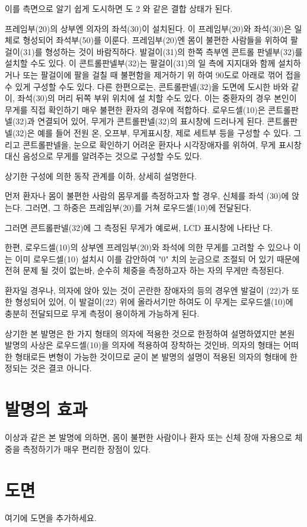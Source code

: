 \documentclass{oblivoir}
\begin{document}
	이를 측면으로 알기 쉽게 도시하면 도 2 와 같은 결합 상태가 된다. 
	
	프레임부(20)의 상부엔 의자의 좌석(30)이 설치된다. 
	이 프레임부(20)와 좌석(30)은 일체로 형성되어 좌석부(50)를 이룬다. 
	프레임부(20)엔 몸이 불편한 사람들을 위하여 팔걸이(31)를 형성하는 것이 바람직하다. 발걸이(31)의 한쪽 측부엔 콘트롤 판넬부(32)를 설치할 수도 있다.
	이 콘트롤판넬부(32)는 팔걸이(31)의 일 측에 지지대와 함께 설치하거나 또는 팔걸이에 팔을 걸칠 때 불편함을 제거하기 위 하여 90도로 아래로 꺾어 접을 수 있게 구성할 수도 있다.
	다른 한편으로는, 콘트롤판넬(32)을 도면에 도시한 바와 같이, 좌석(30)의 머리 뒤쪽 부위 위치에 설 치할 수도 있다. 
	이는 중환자의 경우 본인이 무게를 직접 확인하기 매우 불편한 환자의 경우에 적합하다.
	로우드셀(10)은 콘트롤판넬(32)과 연결되어 있어, 무게가 콘트롤판넬(32)의 표시창에 드러나게 된다. 콘트롤판넬(32)은 예를 들어 전원 온, 오프부, 무게표시창, 제로 세트부 등을 구성할 수 있다. 
	그리고 콘트롤판넬을, 눈으로 확인하기 어려운 환자나 시각장애자를 위하여, 무게 표시창 대신 음성으로 무게를 알려주는 것으로 구성할 수도 있다.
	
	상기한 구성에 의한 동작 관계를 이하, 상세히 설명한다.
	
	먼저 환자나 몸이 불편한 사람의 몸무게를 측정하고자 할 경우, 신체를 좌석 (30)에 앉는다.
	그러면, 그 하중은 프레임부(20)를 거쳐 로우드셀(10)에 전달된다.
	
	
	그러면 콘트롤판넬(32)에 그 측정된 무게가 예로써, LCD 표시창에 나타난 다.
	
	한편, 로우드셀(10)의 상부엔 프레임부(20)와 좌석에 의한 무게를 고려할 수 있으나 이는 이미 로우드셀(10) 설치시 이를 감안하여 "0" 치의 눈금으로 조절되 어 있기 때문에 전혀 문제 될 것이 없는바, 순수히 체중을 측정하고자 하는 자의 무게만 측정된다.
	
	환자일 경우나, 의자에 앉아 있는 것이 곤란한 장애자의 등의 경우엔 발걸이 (22)가 또한 형성되어 있어, 이 발걸이(22) 위에 올라서기만 하여도 이 무게는 로우드셀(10)에 충분히 전달되므로 무게 측정이 용이하게 가능하게 된다.
	
	상기한 본 발명은 한 가지 형태의 의자에 적용한 것으로 한정하여 설명하였지만 본원 발명의 사상은 로우드셀(10)을 의자에 적용하여 장착하는 것인바, 의자의 형태는 어떠한 형태로든 변형이 가능한 것이므로 굳이 본 발명의 설명이 적용된 의자의 형태에 한정되는 것은 결코 아니다.
	
	\section{발명의 효과}
	이상과 같은 본 발명에 의하면, 몸이 불편한 사람이나 환자 또는 신체 장애 자용으로 체중을 측정하기가 매우 편리한 장점이 있다.
	
	\section{도면}
	여기에 도면을 추가하세요.
	
\end{document}

